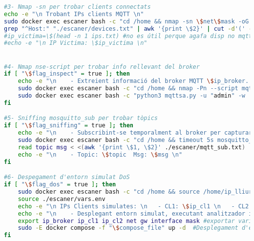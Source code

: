 \begin{lstlisting}[language=bash, caption={Eina automatitzada per a la generació de datasets}, label=lst:tool]
#3- Nmap -sn per trobar clients connectats
echo -e "\n Trobant IPs clients MQTT \n" 
sudo docker exec escaner bash -c "cd /home && nmap -sn \$net\$mask -oG devices.txt"
grep "^Host:" "./escaner/devices.txt" | awk '{print \$2}' | cut -d'(' -f1 > "ips.txt"
#ip_victima=\$(head -n 1 ips.txt) #no es útil perque agafa disp no mqtt
#echo -e "\n IP Victima: \$ip_victima \n"


#4- Nmap nse-script per trobar info rellevant del broker
if [ "\$flag_inspect" = true ]; then 
    echo -e "\n    - Extreient informació del broker MQTT \$ip_broker...\n"
    sudo docker exec escaner bash -c "cd /home && nmap -Pn --script mqtt-subscribe -p 1883 -oG info_broker.txt \$ip_broker" #scipts info broker
    sudo docker exec escaner bash -c "python3 mqttsa.py -u "admin" -w ./psw.txt -t 5 -mp 255 -mq 1000 $ip_broker > info_broker2.txt "
fi

#5- Sniffing mosquitto_sub per trobar tòpics
if [ "\$flag_sniffing" = true ]; then
    echo -e "\n    - Subscribint-se temporalment al broker per capturar missatges: \n"
    sudo docker exec escaner bash -c "cd /home && timeout 5s mosquitto_sub -h \$ip_broker -t '#' -v > mqtt_sub.txt" #escolta pasiva tòpics durant 5s
    read topic msg < <(awk '{print \$1, \$2}' ./escaner/mqtt_sub.txt)  #no cal printejar realment
    echo -e "\n    - Topic: \$topic  Msg: \$msg \n"
fi

#6- Despegament d'entorn simulat DoS
if [ "\$flag_dos" = true ]; then
    sudo docker exec escaner bash -c "cd /home && source /home/ip_lliures.sh \$net\$mask \$num_clients" #IPs lliures a la xarxa  (genera les num_clients seguents a partir de la .100)
    source ./escaner/vars.env
    echo -e "\n IPs Clients simulates: \n   - CL1: \$ip_cl1 \n   - CL2: \$ip_cl2 \n"
    echo -e "\n    - Desplegant entorn simulat, executant analitzador i atac DDoS \n" 
    export ip_broker ip_cl1 ip_cl2 net gw interface mask #exportar variables per ser utilitzades en el docker compose (paràmetre -E)
    sudo -E docker compose -f "\$compose_file" up -d  #Desplegament d'escenari
fi


\end{lstlisting}
